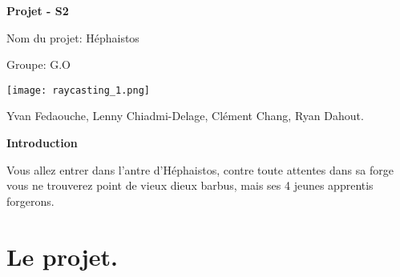 \documentclass[french, 12pt]{article}
\begin{document}
    
    \begin{titlepage}
        \begin{center}

            \color{black}
    
            \Huge
            \textbf{Projet - S2}
    
            \vspace{1.5cm}
    
            \LARGE
            Nom du projet: Héphaistos

            \large
            Groupe: G.O

            \small
            
            \vfill
            \color{gray}
            \texttt{[image: raycasting\_1.png]}

            \selectfont Yvan Fedaouche,
                Lenny Chiadmi-Delage,
                Clément Chang,
                Ryan Dahout.
            
    
        \end{center}
    \end{titlepage}
    \newpage
    \begin{center}

        \color{black}
    
        \Huge
        \textbf{Introduction}
        \newline

        \normalsize

        Vous allez entrer dans l'antre d'Héphaistos, contre toute attentes
        dans sa forge vous ne trouverez point de vieux dieux barbus, mais ses 4 jeunes apprentis forgerons.
        
    \end{center}
    \tableofcontents
    \newpage

    \vspace{1cm}

    \section{Le projet.}
    
\end{document}
